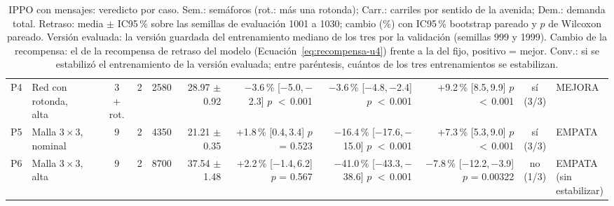 \begin{table}[H]
\begin{tabular}{llcrrrrrrcl}
P4 & \makecell[l]{Red con\\{}rotonda,\\{}alta} & \makecell[c]{3\\{}+ rot.} & 2 & 2580 & \makecell[r]{28.97\\{}$\pm$ 0.92} & \makecell[r]{$-$3.6\,\%\\{}[$-$5.0,\,$-$2.3]\\$p$ $<$\,0.001} & \makecell[r]{$-$3.6\,\%\\{}[$-$4.8,\,$-$2.4]\\$p$ $<$\,0.001} & \makecell[r]{+9.2\,\%\\{}[8.5,\,9.9]\\$p$ $<$\,0.001} & \makecell[c]{sí\\{}(3/3)} & MEJORA \\
P5 & \makecell[l]{Malla $3 \times 3$,\\{}nominal} & 9 & 2 & 4350 & \makecell[r]{21.21\\{}$\pm$ 0.35} & \makecell[r]{+1.8\,\%\\{}[0.4,\,3.4]\\$p$ = 0.523} & \makecell[r]{$-$16.4\,\%\\{}[$-$17.6,\,$-$15.0]\\$p$ $<$\,0.001} & \makecell[r]{+7.3\,\%\\{}[5.3,\,9.0]\\$p$ $<$\,0.001} & \makecell[c]{sí\\{}(3/3)} & EMPATA \\
P6 & \makecell[l]{Malla $3 \times 3$,\\{}alta} & 9 & 2 & 8700 & \makecell[r]{37.54\\{}$\pm$ 1.48} & \makecell[r]{+2.2\,\%\\{}[$-$1.4,\,6.2]\\$p$ = 0.567} & \makecell[r]{$-$41.0\,\%\\{}[$-$43.3,\,$-$38.6]\\$p$ $<$\,0.001} & \makecell[r]{$-$7.8\,\%\\{}[$-$12.2,\,$-$3.9]\\$p$ = 0.00322} & \makecell[c]{no\\{}(1/3)} & \makecell[l]{EMPATA\\{}(sin\\{}estabilizar)} \\
\bottomrule
\end{tabular}
\caption[Veredicto de IPPO con mensajes]{IPPO con mensajes: veredicto por caso. Sem.: semáforos (rot.: más una rotonda); Carr.: carriles por sentido de la avenida; Dem.: demanda total. Retraso: media $\pm$ IC95\,\% sobre las semillas de evaluación 1001 a 1030; cambio (\%) con IC95\,\% bootstrap pareado y $p$ de Wilcoxon pareado. Versión evaluada: la versión guardada del entrenamiento mediano de los tres por la validación (semillas 999 y 1999). Cambio de la recompensa: el de la recompensa de retraso del modelo (Ecuación~\ref{eq:recompensa-u4}) frente a la del fijo, positivo = mejor. Conv.: si se estabilizó el entrenamiento de la versión evaluada; entre paréntesis, cuántos de los tres entrenamientos se estabilizan.}
\label{tab:veredicto-ippo-vecinos}
\end{table}
